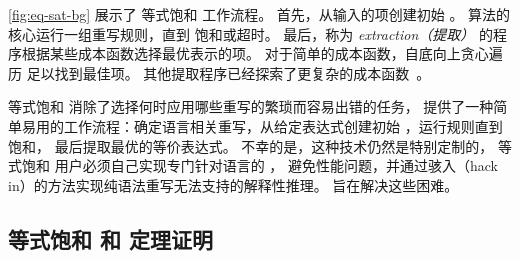 \autoref{fig:eq-sat-bg} 展示了 等式饱和 工作流程。
首先，从输入的项创建初始 \egraph。
算法的核心运行一组重写规则，直到 \egraph 饱和或超时。
最后，称为 \textit{extraction（提取）} 的程序根据某些成本函数选择最优表示的项。
对于简单的成本函数，自底向上贪心遍历 \egraph 足以找到最佳项。
其他提取程序已经探索了更复杂的成本函数~\cite{spores, wu_siga19}。

等式饱和 消除了选择何时应用哪些重写的繁琐而容易出错的任务，
提供了一种简单易用的工作流程：确定语言相关重写，从给定表达式创建初始 \egraph ，运行规则直到饱和，
  最后提取最优的等价表达式。
不幸的是，这种技术仍然是特别定制的，
  等式饱和 用户必须自己实现专门针对语言的 \egraph，
  避免性能问题，并通过骇入（hack in）的方法实现纯语法重写无法支持的解释性推理。
\egg 旨在解决这些困难。

\subsection{等式饱和 和 定理证明}

